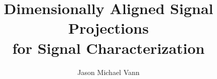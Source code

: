 \documentclass[11pt, twoside]{report}
\title{Dimensionally Aligned Signal Projections\\for Signal Characterization} %
\author{Jason Michael Vann} %
\newcounter{appendix}
\begin{document}
                         
\beforepreface         %
\dedicationpage        %
\acknowledgmentspage   %
%  
\afterpreface          %
%           
\ttutext               %
     
   
    
    
   

     
     
 
\appendixnodots
   
 
   

      
\end{document}

